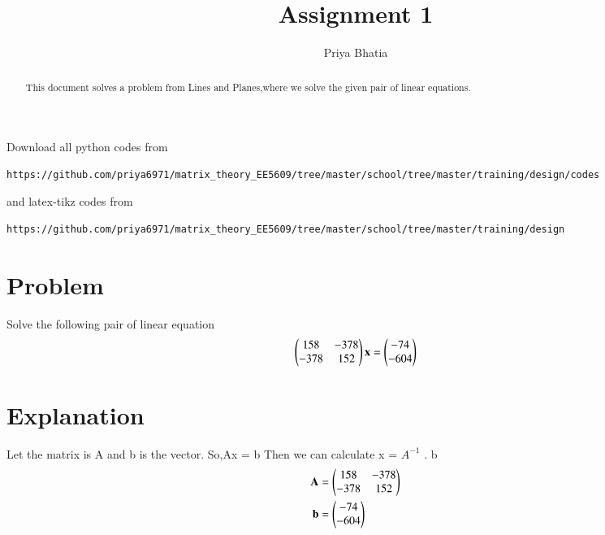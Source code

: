 \documentclass[journal,12pt,twocolumn]{IEEEtran}
\begin{document}
     \def\rightbox#1{\makebox[0in][r]{#1}}
     \def\centbox#1{\makebox[0in]{#1}}
     \def\topbox#1{\raisebox{-\baselineskip}[0in][0in]{#1}}
     \def\midbox#1{\raisebox{-0.5\baselineskip}[0in][0in]{#1}}
\vspace{3cm}
\title{Assignment 1}
\author{Priya Bhatia}
\maketitle
\newpage
\bigskip
\renewcommand{\thefigure}{\theenumi}
\renewcommand{\thetable}{\theenumi}
\begin{abstract}
This document solves a problem from Lines and Planes,where we solve the given pair of linear equations.
\end{abstract}
Download all python codes from
\begin{lstlisting}
https://github.com/priya6971/matrix_theory_EE5609/tree/master/school/tree/master/training/design/codes
\end{lstlisting}
%
and latex-tikz codes from
%
\begin{lstlisting}
https://github.com/priya6971/matrix_theory_EE5609/tree/master/school/tree/master/training/design
\end{lstlisting}
%
\section{Problem}
Solve the following pair of linear equation
\begin{align}
\begin{pmatrix}  158 & -378 \\ -378 & 152\end{pmatrix}\mathbf{x}=
\begin{pmatrix}  -74 \\ -604\end{pmatrix}
\end{align}
\section{Explanation}
Let the matrix is A and b is the vector.
So,Ax = b
Then we can calculate x = $A^{-1}$ . b
\begin{align}
\mathbf{A}&= \begin{pmatrix}158 & -378 \\ -378 & 152\end{pmatrix} \\
\mathbf{b}&= \begin{pmatrix}-74 \\ -604\end{pmatrix}
\end{align}
\end{document}
